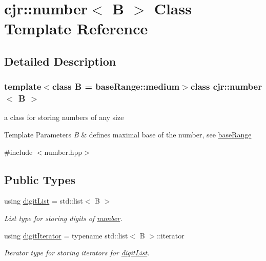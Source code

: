 \hypertarget{classcjr_1_1number}{\section{cjr\-:\-:number$<$ B $>$ Class Template Reference}
\label{classcjr_1_1number}
}


\subsection{Detailed Description}
\subsubsection*{template$<$class B = base\-Range\-::medium$>$class cjr\-::number$<$ B $>$}

a class for storing numbers of any size 


\begin{DoxyTemplParams}{Template Parameters}
{\em B} & defines maximal base of the number, see \hyperlink{classcjr_1_1base_range}{base\-Range} \\
\hline
\end{DoxyTemplParams}


{\ttfamily \#include $<$number.\-hpp$>$}

\subsection*{Public Types}
\begin{DoxyCompactItemize}
\item 
\hypertarget{classcjr_1_1number_a64ca3e7862f3f4940065b93d38c1a465}{using \hyperlink{classcjr_1_1number_a64ca3e7862f3f4940065b93d38c1a465}{digit\-List} = std\-::list$<$ B $>$}\label{classcjr_1_1number_a64ca3e7862f3f4940065b93d38c1a465}

\begin{DoxyCompactList}\small\item\em List type for storing digits of \hyperlink{classcjr_1_1number}{number}. \end{DoxyCompactList}\item 
\hypertarget{classcjr_1_1number_a137416a57d724f8b6a5c14bab7c6802b}{using \hyperlink{classcjr_1_1number_a137416a57d724f8b6a5c14bab7c6802b}{digit\-Iterator} = typename std\-::list$<$ B $>$\-::iterator}\label{classcjr_1_1number_a137416a57d724f8b6a5c14bab7c6802b}

\begin{DoxyCompactList}\small\item\em Iterator type for storing iterators for \hyperlink{classcjr_1_1number_a64ca3e7862f3f4940065b93d38c1a465}{digit\-List}. \end{DoxyCompactList}\end{DoxyCompactItemize}
